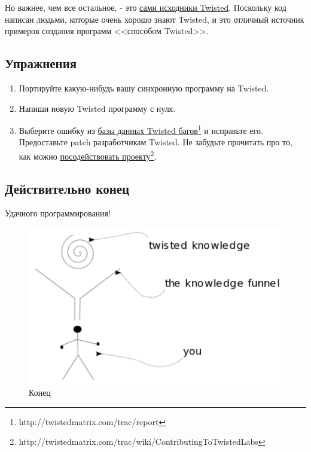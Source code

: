 Но важнее, чем все остальное, - это 
\href{http://twistedmatrix.com/trac/browser/trunk}{сами исходники Twisted}. Поскольку 
код написан людьми, которые очень хорошо знают Twisted, и это отличный 
источник примеров создания программ <<способом Twisted>>.


\subsection{Упражнения}

\begin{enumerate}

\item Портируйте какую-нибудь вашу синхронную программу на Twisted.

\item Напиши новую Twisted программу с нуля.

\item Выберите ошибку из \href{http://twistedmatrix.com/trac/report}{базы данных Twisted багов}\footnote[4]{http://twistedmatrix.com/trac/report} и исправьте его. 
Предоставьте patch разработчикам Twisted. Не забудьте 
прочитать про то, как можно 
\href{http://twistedmatrix.com/trac/wiki/ContributingToTwistedLabs}{посодействовать проекту}\footnote[5]{http://twistedmatrix.com/trac/wiki/ContributingToTwistedLabs}.

\end{enumerate}


\subsection{Действительно конец}

Удачного программирования!

\begin{figure}[h]
\begin{center}
    \includegraphics[width=1.\textwidth]{images/theend.pdf}
    \caption{Конец\label{fig:theend}}
\end{center}
\end{figure}


